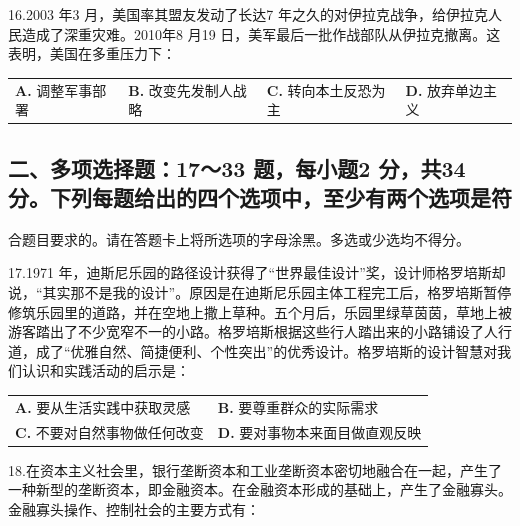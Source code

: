 \documentclass[UTF8,11pt]{ctexart}
\begin{document}
16.2003 年3 月，美国率其盟友发动了长达7 年之久的对伊拉克战争，给伊拉克人民造成了深重灾难。2010年8 月19 日，美军最后一批作战部队从伊拉克撤离。这表明，美国在多重压力下：


\begin{center}\begin{tabular}{>{\raggedright\arraybackslash}p{\dimexpr(\linewidth-8\tabcolsep)/4\relax}>{\raggedright\arraybackslash}p{\dimexpr(\linewidth-8\tabcolsep)/4\relax}>{\raggedright\arraybackslash}p{\dimexpr(\linewidth-8\tabcolsep)/4\relax}>{\raggedright\arraybackslash}p{\dimexpr(\linewidth-8\tabcolsep)/4\relax}}
\textbf{A.} 调整军事部署 & \textbf{B.} 改变先发制人战略 & \textbf{C.} 转向本土反恐为主 & \textbf{D.} 放弃单边主义\\[.35em]\end{tabular}\end{center}

\subsection*{二、多项选择题：17～33 题，每小题2 分，共34 分。下列每题给出的四个选项中，至少有两个选项是符}

合题目要求的。请在答题卡上将所选项的字母涂黑。多选或少选均不得分。


17.1971 年，迪斯尼乐园的路径设计获得了“世界最佳设计”奖，设计师格罗培斯却说，“其实那不是我的设计”。原因是在迪斯尼乐园主体工程完工后，格罗培斯暂停修筑乐园里的道路，并在空地上撒上草种。五个月后，乐园里绿草茵茵，草地上被游客踏出了不少宽窄不一的小路。格罗培斯根据这些行人踏出来的小路铺设了人行道，成了“优雅自然、简捷便利、个性突出”的优秀设计。格罗培斯的设计智慧对我们认识和实践活动的启示是：


\begin{center}\begin{tabular}{>{\raggedright\arraybackslash}p{\dimexpr(\linewidth-4\tabcolsep)/2\relax}>{\raggedright\arraybackslash}p{\dimexpr(\linewidth-4\tabcolsep)/2\relax}}
\textbf{A.} 要从生活实践中获取灵感 & \textbf{B.} 要尊重群众的实际需求\\[.35em]
\textbf{C.} 不要对自然事物做任何改变 & \textbf{D.} 要对事物本来面目做直观反映\\[.35em]\end{tabular}\end{center}

18.在资本主义社会里，银行垄断资本和工业垄断资本密切地融合在一起，产生了一种新型的垄断资本，即金融资本。在金融资本形成的基础上，产生了金融寡头。金融寡头操作、控制社会的主要方式有：
\end{document}

